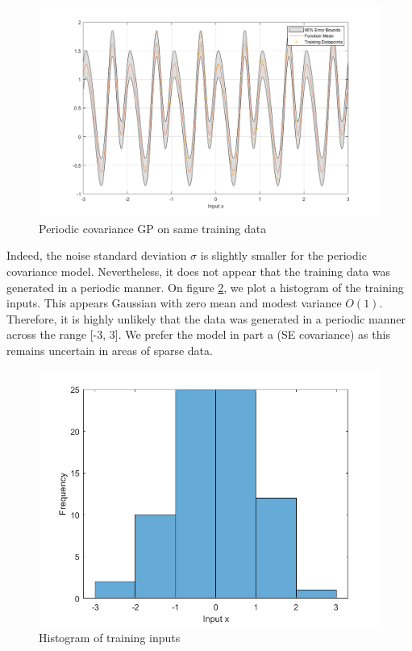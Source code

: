 \documentclass[]{article}
\newcommand{\figwidth}{0.6\linewidth}
\begin{document}
\begin{figure}[!h]
	\centering
	\includegraphics[width=\figwidth]{1c}
	\caption{Periodic covariance GP on same training data}
	\label{fig:1c}
\end{figure}

Indeed, the noise standard deviation $\sigma$ is slightly smaller for the periodic covariance model. Nevertheless, it does not appear that the training data was generated in a periodic manner. On figure \ref{fig:1c1}, we plot a histogram of the training inputs. This appears Gaussian with zero mean and modest variance $O(1)$. Therefore, it is highly unlikely that the data was generated in a periodic manner across the range [-3, 3]. We prefer the model in part a (SE covariance) as this remains uncertain in areas of sparse data.

\begin{figure}[!h]
	\centering
	\includegraphics[width=\figwidth]{1c1}
	\caption{Histogram of training inputs}
	\label{fig:1c1}
\end{figure}
\end{document}
